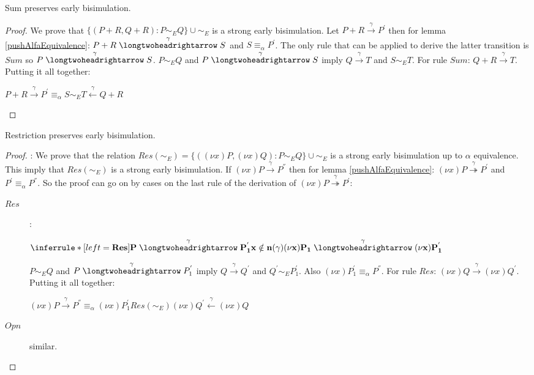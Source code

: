 \begin{lemma}
  Sum preserves early bisimulation. 
  \begin{proof}
    We prove that $\{(P+R, Q+R): P\sim_{E}Q\}\cup \sim_{E}$ is a strong early bisimulation. Let $P+R\xrightarrow{\gamma}P^{'}$ then for lemma \ref{pushAlfaEquivalence}: $P+R\stackrel{\gamma}{\longtwoheadrightarrow} S$ and $S\equiv_{\alpha}P^{'}$. The only rule that can be applied to derive the latter transition is $Sum$ so $P\stackrel{\gamma}{\longtwoheadrightarrow} S$. $P\sim_{E} Q$ and $P\stackrel{\gamma}{\longtwoheadrightarrow} S$ imply $Q\xrightarrow{\gamma} T$ and $S\sim_{E} T$. For rule $Sum$: $Q+R\xrightarrow{\gamma} T$. Putting it all together:
    \begin{center}
      $P+R\xrightarrow{\gamma}P^{'} \equiv_{\alpha} S \sim_{E} T \stackrel{\gamma}{\longleftarrow} Q+R$
    \end{center}
  \end{proof}
\end{lemma}

\begin{lemma}
  Restriction preserves early bisimulation.
  \begin{proof}:
      We prove that the relation $Res(\sim_{E})=\{((\nu x)P, (\nu x)Q): P\sim_{E} Q\} \cup \sim_{E}$ is a strong early bisimulation up to $\alpha$ equivalence. This imply that $Res(\sim_{E})$ is a strong early bisimulation. If $(\nu x)P\xrightarrow{\gamma}P^{''}$ then for lemma \ref{pushAlfaEquivalence}: $(\nu x)P\stackrel{\gamma}{\twoheadrightarrow}P^{'}$ and $P^{'}\equiv_{\alpha}P^{''}$. So the proof can go on by cases on the last rule of the derivation of $(\nu x)P\stackrel{\gamma}{\twoheadrightarrow} P^{'}$:
	\begin{description}
 	  \item[$Res$]:
   	    \begin{center}
   	      $\inferrule* [left=\bf{Res}]{
		    P \stackrel{\gamma}{\longtwoheadrightarrow} P_{1}^{'}
		  \\
		    x \notin n(\gamma)
		  }{
		    (\nu x)P_{1} \stackrel{\gamma}{\longtwoheadrightarrow} (\nu x)P_{1}^{'}
	      }$
   	    \end{center}
 	    $P\sim_{E}Q$ and $P \stackrel{\gamma}{\longtwoheadrightarrow} P_{1}^{'}$ imply $Q \xrightarrow{\gamma} Q^{'}$ and $Q^{'} \sim_{E} P_{1}^{'}$. Also $(\nu x)P_{1}^{'} \equiv_{\alpha} P^{''}$. For rule $Res$: $(\nu x)Q \xrightarrow{\gamma} (\nu x)Q^{'}$. Putting it all together:
 	    \begin{center}
 	      $(\nu x)P \xrightarrow{\gamma} P^{''} \equiv_{\alpha} (\nu x)P_{1}^{'}  Res(\sim_{E}) (\nu x)Q^{'} \stackrel{\gamma}{\leftarrow} (\nu x)Q$
 	    \end{center}
  	  \item[$Opn$] similar.
	\end{description}
  \end{proof}
\end{lemma}


